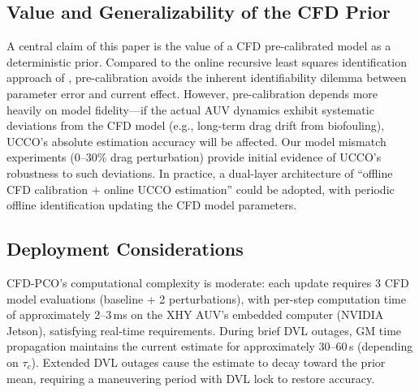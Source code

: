 \subsection{Value and Generalizability of the CFD Prior}

A central claim of this paper is the value of a CFD pre-calibrated model as a deterministic prior. Compared to the online recursive least squares identification approach of \cite{kim2018estimating}, pre-calibration avoids the inherent identifiability dilemma between parameter error and current effect. However, pre-calibration depends more heavily on model fidelity---if the actual AUV dynamics exhibit systematic deviations from the CFD model (e.g., long-term drag drift from biofouling), UCCO's absolute estimation accuracy will be affected. Our model mismatch experiments (0--30\% drag perturbation) provide initial evidence of UCCO's robustness to such deviations. In practice, a dual-layer architecture of ``offline CFD calibration + online UCCO estimation'' could be adopted, with periodic offline identification updating the CFD model parameters.

\subsection{Deployment Considerations}

CFD-PCO's computational complexity is moderate: each update requires 3 CFD model evaluations (baseline + 2 perturbations), with per-step computation time of approximately 2--3\,ms on the XHY AUV's embedded computer (NVIDIA Jetson), satisfying real-time requirements. During brief DVL outages, GM time propagation maintains the current estimate for approximately 30--60\,s (depending on $\tau_c$). Extended DVL outages cause the estimate to decay toward the prior mean, requiring a maneuvering period with DVL lock to restore accuracy.
